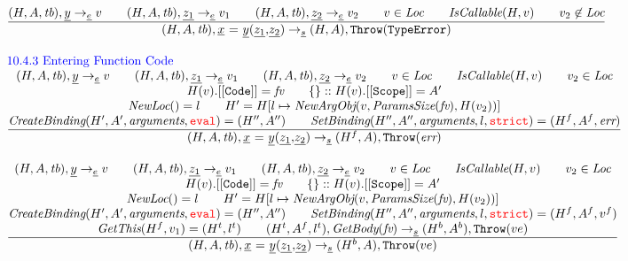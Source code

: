\[\begin{array}{l@{~~}l@{~~}ll}
\frac{\begin{matrix}
\evale, \ir{y} \rightarrow_{\ir\expr} v
\rulesep
\evale, \ir{z_1} \rightarrow_{\ir\expr} v_1
\rulesep
\evale, \ir{z_2} \rightarrow_{\ir\expr} v_2
\rulesep
v \in \Loc
\rulesep
\hf{IsCallable}(H,v)
\rulesep
v_2 \not\in \Loc
\end{matrix}}{\begin{matrix}
\state, \ircall \rightarrow_{\ir\stmt}
\res, \thte
\end{matrix}}
\\[2em]

\mbox{\inblue 10.4.3 Entering Function Code}\\
\frac{\begin{matrix}
\evale, \ir{y} \rightarrow_{\ir\expr} v
\rulesep
\evale, \ir{z_1} \rightarrow_{\ir\expr} v_1
\rulesep
\evale, \ir{z_2} \rightarrow_{\ir\expr} v_2
\rulesep
v \in \Loc
\rulesep
\hf{IsCallable}(H,v)
\rulesep
v_2 \in \Loc
\\
H(v).{\tt[[Code]]} = \emph{fv}
\rulesep
\{\}::H(v).{\tt[[Scope]]} = A'
\\
\hf{NewLoc}() = l
\rulesep
H' = H[l\mapsto \hf{NewArgObj}(v, \hf{ParamsSize}(\emph{fv}), H(v_2))]
\\
\hf{CreateBinding}(H', A', \hf{arguments}, \eval) = \respp%
\rulesep
\hf{SetBinding}(H'', A'', \hf{arguments}, l, \strict) = (H^f, A^f, \err)%
\end{matrix}}{\begin{matrix}
\state, \ircall \rightarrow_{\ir\stmt}
(H^f, A), \error
\end{matrix}}
\\[2em]

\frac{\begin{matrix}
\evale, \ir{y} \rightarrow_{\ir\expr} v
\rulesep
\evale, \ir{z_1} \rightarrow_{\ir\expr} v_1
\rulesep
\evale, \ir{z_2} \rightarrow_{\ir\expr} v_2
\rulesep
v \in \Loc
\rulesep
\hf{IsCallable}(H,v)
\rulesep
v_2 \in \Loc
\\
H(v).{\tt[[Code]]} = \emph{fv}
\rulesep
\{\}::H(v).{\tt[[Scope]]} = A'
\\
\hf{NewLoc}() = l
\rulesep
H' = H[l\mapsto \hf{NewArgObj}(v, \hf{ParamsSize}(\emph{fv}), H(v_2))]
\\
\hf{CreateBinding}(H', A', \hf{arguments}, \eval) = \respp%
\rulesep
\hf{SetBinding}(H'', A'', \hf{arguments}, l, \strict) = (H^f, A^f, v^f)%
\\
\hf{GetThis}(H^f,v_1) = (H^t,l^t)
\rulesep
(H^t, A^f, l^t), \hf{GetBody}(\emph{fv}) \rightarrow_{\ir\stmt} (H^b, A^b), {\tt Throw}(ve)
\end{matrix}}{\begin{matrix}
\state, \ircall \rightarrow_{\ir\stmt}
(H^b, A), {\tt Throw}(ve)
\end{matrix}}
\\[2em]


\end{array}\]
